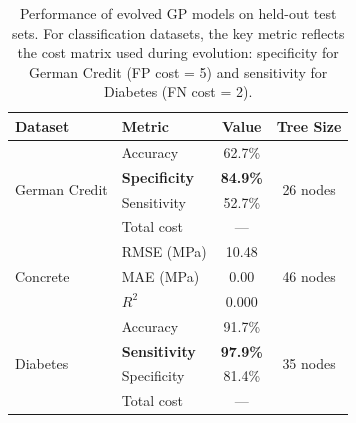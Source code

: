 \begin{table}[ht]
  \centering
  \caption{Performance of evolved GP models on held-out test sets. For classification datasets, the key metric reflects the cost matrix used during evolution: specificity for German Credit (FP cost = 5) and sensitivity for Diabetes (FN cost = 2).}
  \label{tab:performance}
  \begin{tabular}{@{}llcc@{}}
    \toprule
    \textbf{Dataset} & \textbf{Metric} & \textbf{Value} & \textbf{Tree Size} \\
    \midrule
    \multirow{4}{*}{German Credit} & Accuracy & 62.7\% & \multirow{4}{*}{26 nodes} \\
    & \textbf{Specificity} & \textbf{84.9\%} & \\
    & Sensitivity & 52.7\% & \\
    & Total cost & --- & \\
    \midrule
    \multirow{3}{*}{Concrete} & RMSE (MPa) & 10.48 & \multirow{3}{*}{46 nodes} \\
    & MAE (MPa) & 0.00 & \\
    & $R^2$ & 0.000 & \\
    \midrule
    \multirow{4}{*}{Diabetes} & Accuracy & 91.7\% & \multirow{4}{*}{35 nodes} \\
    & \textbf{Sensitivity} & \textbf{97.9\%} & \\
    & Specificity & 81.4\% & \\
    & Total cost & --- & \\
    \bottomrule
  \end{tabular}
\end{table}